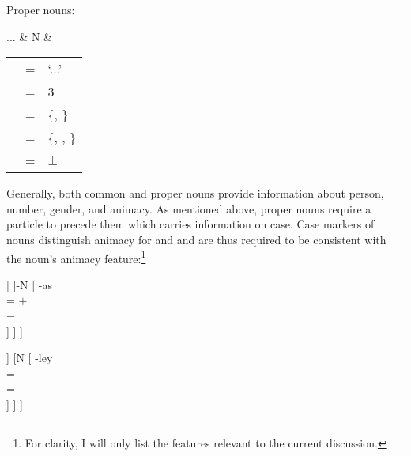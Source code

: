 \a Proper nouns:\\

	\begin{tabu} {}
	...
		& N
		& \begin{tabular}[t]{l l l}
			\ups{\Pred} & = & `...' \\
			\ups{\Pers} & = & 3 \\
			\ups{\Num} & = & \{\Sg{}, \Pl{}\} \\
			\ups{\Gend} & = & \{\M{}, \F{}, \N{}\} \\
			\ups{\Anim} & = & $\pm$ \\
		\end{tabular}
	\end{tabu}

\xe

Generally, both common and proper nouns provide information about person, 
number, gender, and animacy. As mentioned above, proper nouns require a 
particle to precede them which carries information on case. Case markers of 
nouns distinguish animacy for \Aarg{} and \Parg{} and are thus required to be 
consistent with the noun's animacy feature:\footnote{For clarity, I will only 
list the features relevant to the current discussion.}

\ex{}%
\begin{minipage}[t]{.5\linewidth}
\tl\label{ex:animok}\quad %
\begin{forest}
[{%
\xhead{N} \\
\ups{\Anim} = $+$ \\
\ups{\Case} = \Parg{}
}
	[N\tsub{stem}
		[{%
			gan \\
			\ups{\Anim} = $+$ \\
		}]
	]
	[-N
		[{%
			-as \\
			\ups{\Anim} = $+$ \\
			\ups{\Case} = \Parg{} \\
		}]
	]
]
\end{forest}
\end{minipage}
\begin{minipage}[t]{.5\linewidth}
\tl\label{ex:animclash}\quad %
\ljudge*\begin{forest}
[{%
\xhead{N} \\
\ups{\Anim} = \err{} \\
\ups{\Case} = \Parg{}
}
	[N\tsub{stem}
		[{%
			gan \\
			\ups{\Anim} = $+$ \\
		}]
	]
	[N
		[{%
			-ley \\
			\ups{\Anim} = $-$ \\
			\ups{\Case} = \Parg{} \\
		}]
	]
]
\end{forest}
\end{minipage}
\xe

